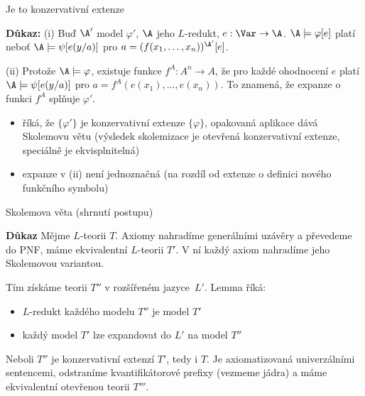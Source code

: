 \documentclass{beamer}
\begin{document}
\begin{frame}{Je to konzervativní extenze}


    \textbf{Důkaz:} \alert{(i)} Buď $\A'$ model $\varphi'$, $\A$ jeho $L$-redukt, $e:\Var\to\A$. $\A\models\varphi[e]$ platí neboť $\A\models\psi[e(y/a)]$ pro $a=(f(x_1,\dots,x_n))^{\A'}[e]$.
    
    \alert{(ii)} Protože $\A\models\varphi$, existuje funkce $f^A:A^n\to A$, že pro každé ohodnocení $e$ platí $\A\models \psi[e(y/a)]$ pro $a=f^A(e(x_1),\dots,e(x_n))$. To znamená, že expanze o funkci $f^A$ splňuje $\varphi'$.\hfill\qedsymbol 
    \begin{itemize}
        \item říká, že $\{\varphi'\}$ je konzervativní extenze $\{\varphi\}$, opakovaná aplikace dává \alert{Skolemovu větu} (výsledek skolemizace je otevřená konzervativní extenze, speciálně je ekvisplnitelná)  
        \item expanze v (ii) není jednoznačná (na rozdíl od extenze o definici nového funkčního symbolu)      
    \end{itemize}
   
\end{frame}


\begin{frame}{Skolemova věta (shrnutí postupu)}


    \textbf{Důkaz} Mějme $L$-teorii $T$. Axiomy nahradíme generálními uzávěry a převedeme do PNF, máme ekvivalentní $L$-teorii $T'$. V ní každý axiom nahradíme jeho Skolemovou variantou. 
    
    Tím získáme teorii $T''$ v rozšířeném jazyce~$L'$. Lemma říká:
    \begin{itemize}
        \item $L$-redukt každého modelu $T''$ je model $T'$
        \item každý model $T'$ lze expandovat do $L'$ na model $T''$
       \end{itemize}
    Neboli $T''$ je konzervativní extenzí $T'$, tedy i $T$. Je axiomatizovaná  univerzálními sentencemi, odstraníme kvantifikátorové prefixy (vezmeme jádra) a máme ekvivalentní otevřenou teorii $T'''$.    
    \hfill\qedsymbol

    \medskip


\end{frame}
\end{document}
